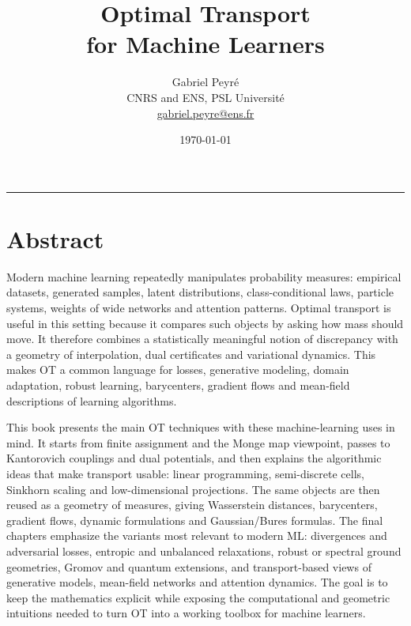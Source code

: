 \documentclass[10pt,a4paper,twoside,openany]{book}
\title{Optimal Transport\\for Machine Learners}
\author{%
\begin{tabular}{c}
	Gabriel Peyr{\'e} \\ CNRS and ENS, PSL Universit\'e \\
	 \url{gabriel.peyre@ens.fr}
\end{tabular}
}
\date{\today}
\makeatletter
\renewcommand{\maketitle}{%
\begin{titlepage}
\thispagestyle{empty}
\vspace*{.08\textheight}
\noindent{\color{otblue}\rule{\textwidth}{1.1pt}}\par
\vspace{1.4cm}
{\centering\fontsize{30}{36}\selectfont\bfseries\color{otblue}\@title\par}
\vspace{1.2cm}
{\centering\large\@author\par}
\vfill
\begin{center}
{\color{otred}\rule{.38\textwidth}{2pt}}\par
\vspace{.65cm}
{\large\@date\par}
\end{center}
\end{titlepage}
}
\makeatother
\begin{document}
\hypersetup{pageanchor=false}
\maketitle
\cleardoublepage
\hypersetup{pageanchor=true}

\frontmatter

\chapter*{Abstract}
Modern machine learning repeatedly manipulates probability measures: empirical datasets, generated samples, latent distributions, class-conditional laws, particle systems, weights of wide networks and attention patterns. Optimal transport is useful in this setting because it compares such objects by asking how mass should move. It therefore combines a statistically meaningful notion of discrepancy with a geometry of interpolation, dual certificates and variational dynamics. This makes OT a common language for losses, generative modeling, domain adaptation, robust learning, barycenters, gradient flows and mean-field descriptions of learning algorithms.

This book presents the main OT techniques with these machine-learning uses in mind. It starts from finite assignment and the Monge map viewpoint, passes to Kantorovich couplings and dual potentials, and then explains the algorithmic ideas that make transport usable: linear programming, semi-discrete cells, Sinkhorn scaling and low-dimensional projections. The same objects are then reused as a geometry of measures, giving Wasserstein distances, barycenters, gradient flows, dynamic formulations and Gaussian/Bures formulas. The final chapters emphasize the variants most relevant to modern ML: divergences and adversarial losses, entropic and unbalanced relaxations, robust or spectral ground geometries, Gromov and quantum extensions, and transport-based views of generative models, mean-field networks and attention dynamics. The goal is to keep the mathematics explicit while exposing the computational and geometric intuitions needed to turn OT into a working toolbox for machine learners.
\end{document}
